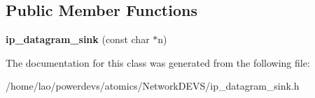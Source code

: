 \subsection*{Public Member Functions}
\begin{DoxyCompactItemize}
\item 
{\bfseries ip\+\_\+datagram\+\_\+sink} (const char $\ast$n)\hypertarget{classip__datagram__sink_a660e2f26390312a94d8e4a2fbc0e4614}{}\label{classip__datagram__sink_a660e2f26390312a94d8e4a2fbc0e4614}

\end{DoxyCompactItemize}


The documentation for this class was generated from the following file\+:\begin{DoxyCompactItemize}
\item 
/home/lao/powerdevs/atomics/\+Network\+D\+E\+V\+S/ip\+\_\+datagram\+\_\+sink.\+h\end{DoxyCompactItemize}
